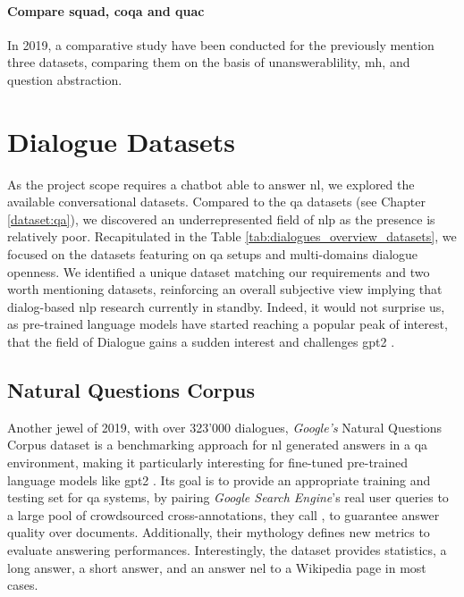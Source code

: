 \paragraph{Compare \gls{squad}, \gls{coqa} and \gls{quac}}
In 2019, a comparative study \autocite{paper:journals/corr/abs-1809-10735} have been conducted for the previously mention three datasets, comparing them on the basis of unanswerablility, \gls{mh}, and question abstraction.


\section{Dialogue Datasets}
\label{dataset:dialogue}
As the project scope requires a chatbot able to answer \gls{nl}, we explored the available conversational datasets. Compared to the \gls{qa} datasets (see Chapter \ref{dataset:qa}), we discovered an underrepresented field of \gls{nlp} as the presence is relatively poor. Recapitulated in the Table \ref{tab:dialogues_overview_datasets}, we focused on the datasets featuring on \gls{qa} setups and multi-domains dialogue openness. We identified a unique dataset matching our requirements and two worth mentioning datasets, reinforcing an overall subjective view implying that dialog-based \gls{nlp} research currently in standby. Indeed, it would not surprise us, as pre-trained language models have started reaching a popular peak of interest, that the field of Dialogue gains a sudden interest and challenges \gls{gpt2} \autocite{papers:gpt2}.


\subsection{Natural Questions Corpus}
\label{dataset:googlenatural}
Another jewel of 2019, with over 323'000 dialogues, \textit{Google's} Natural Questions Corpus dataset \autocite{paper:google-natural-questions} is a benchmarking approach for \gls{nl} generated answers in a \gls{qa} environment, making it particularly interesting for fine-tuned pre-trained language models like \gls{gpt2} \autocite{papers:gpt2}. Its goal is to provide an appropriate training and testing set for \gls{qa} systems, by pairing \textit{Google Search Engine}'s real user queries to a large pool of crowdsourced cross-annotations, they call , to guarantee answer quality over documents. Additionally, their mythology defines new metrics to evaluate answering performances. Interestingly, the dataset provides statistics, a long answer, a short answer, and an answer \gls{nel} to a Wikipedia page in most cases.

